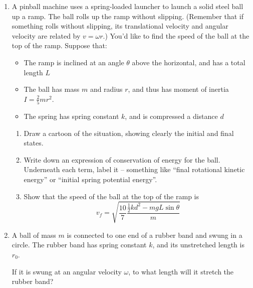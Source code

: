 \documentclass[12pt]{article}
\newcommand{\BI}{\begin{itemize}}
\newcommand{\EI}{\end{itemize}}
\begin{document}
\begin{enumerate}
\item A pinball machine uses a spring-loaded launcher to launch a solid steel ball up a ramp. The ball rolls up the ramp without slipping. (Remember that if something rolls without slipping, its translational
velocity and angular velocity are related by $v=\omega r$.) You'd like to find the speed of the ball at the top of the ramp. Suppose that:

\BI
\item The ramp is inclined at an angle $\theta$ above the horizontal, and has a total length $L$
\item The ball has mass $m$ and radius $r$, and thus has moment of inertia $I=\frac{2}{5}mr^2$.
\item The spring has spring constant $k$, and is compressed a distance $d$
\EI

\begin{enumerate}

\item Draw a cartoon of the situation, showing clearly the initial and final states.

\vspace{3in}

\item Write down an expression of conservation of energy for the ball. Underneath each term, label it -- something like ``final rotational kinetic energy'' or ``initial spring potential energy''.

\vspace{3in}
\newpage
\item Show that the speed of the ball at the top of the ramp is $$v_f = \sqrt {\frac{10}{7} \frac {\frac{1}{2}kd^2 - mgL \sin \theta}{m}}$$
\vspace{4in}
\end{enumerate}

\item A ball of mass $m$ is connected to one end of a rubber band and swung in a circle. The rubber band has spring constant $k$, and
its unstretched length is $r_0$.

If it is swung at an angular velocity $\omega$, to what length will it stretch the rubber band?



\end{enumerate}
\end{document}

